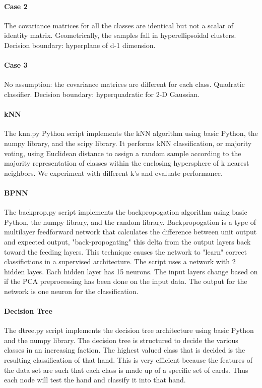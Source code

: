 \documentclass{article}
\begin{document}
\paragraph{Case 2}
The covariance matrices for all the classes are identical but not a scalar of identity matrix.
Geometrically, the samples fall in hyperellipsoidal clusters.  
Decision boundary: hyperplane of d-1 dimension.
\paragraph{Case 3}
No assumption: the covariance matrices are different for each class.  
Quadratic classifier.  
Decision boundary: hyperquadratic for 2-D Gaussian.

\paragraph{kNN} 
The knn.py Python script implements the kNN algorithm using basic Python, the numpy library,
and the scipy library.  It performs kNN classification, or majority voting, using Euclidean
distance to assign a random sample according to the majority representation of classes
within the enclosing hypersphere of k nearest neighbors.  We experiment with different k's
and evaluate performance.

\paragraph{BPNN} 
The backprop.py script implements the backpropogation algorithm using basic Python, the numpy
library, and the random library.  Backpropogation is a type of multilayer feedforward network
that calculates the difference between unit output and expected output, "back-propogating"
this delta from the output layers back toward the feeding layers.  This technique causes the
network to "learn" correct classifictions in a supervised architecture. The script uses a network with 2 hidden layes. Each hidden layer has 15 neurons. The input layers change based on if the PCA preprocessing has been done on the input data. The output for the network is one neuron for the classification.

\paragraph{Decision Tree} 
The dtree.py script implements the decision tree architecture using basic Python and the numpy
library.  The decision tree is structured to decide the various classes in an increasing faction. The highest valued
class that is decided is the resulting classification of that hand. This is very efficient because the features of the
data set are such that each class is made up of a specific set of cards. Thus each node will test the hand and classify it into that hand.
\end{document}
